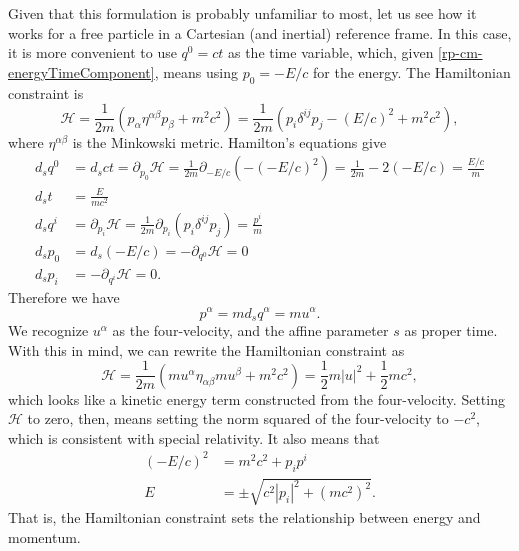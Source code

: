 Given that this formulation is probably unfamiliar to most, let us see how it works for a free particle in a Cartesian (and inertial) reference frame. In this case, it is more convenient to use $q^0=ct$ as the time variable, which, given \ref{rp-cm-energyTimeComponent}, means using $p_0=-E/c$ for the energy. The Hamiltonian constraint is
\begin{equation}
	\mathcal{H} = \frac{1}{2m} \left(p_\alpha \eta^{\alpha\beta} p_\beta + m^2c^2  \right) = \frac{1}{2m} \left(p_i \delta^{ij} p_j - (E/c)^2 + m^2c^2  \right),
\end{equation}
where $\eta^{\alpha\beta}$ is the Minkowski metric. Hamilton's equations give
\begin{equation}
	\begin{aligned}
		d_s q^0 &= d_s ct = \partial_{p_0} \mathcal{H} = \frac{1}{2m}  \partial_{-E/c} (- (-E/c)^2) = \frac{1}{2m} - 2 (-E/c) = \frac{E/c}{m} \\
		d_s t &= \frac{E}{mc^2} \\
		d_s q^i &= \partial_{p_i} \mathcal{H} = \frac{1}{2m} \partial_{p_i} \left( p_i \delta^{ij} p_j \right) = \frac{p^i}{m} \\
		d_s p_0 &= d_s (-E/c) = - \partial_{q^0} \mathcal{H} = 0 \\
		d_s p_i &= - \partial_{q^i} \mathcal{H} = 0.
	\end{aligned}
\end{equation}
Therefore we have
\begin{equation}
	p^\alpha = m d_s q^\alpha = m u^\alpha.
\end{equation}
We recognize $u^\alpha$ as the four-velocity, and the affine parameter $s$ as proper time. With this in mind, we can rewrite the Hamiltonian constraint as
\begin{equation}
	\mathcal{H} = \frac{1}{2m} \left( mu^\alpha \eta_{\alpha\beta} mu^\beta + m^2c^2 \right) = \frac{1}{2} m |u|^2 + \frac{1}{2} m c^2,
\end{equation}
which looks like a kinetic energy term constructed from the four-velocity. Setting $\mathcal{H}$ to zero, then, means setting the norm squared of the four-velocity to $-c^2$, which is consistent with special relativity. It also means that 
\begin{equation}
	\begin{aligned}
		(-E/c)^2 &= m^2c^2 + p_i p^i \\
		E &= \pm \sqrt{c^2 |p_i|^2 + (mc^2)^2 }.
	\end{aligned}
\end{equation}
That is, the Hamiltonian constraint sets the relationship between energy and momentum.

